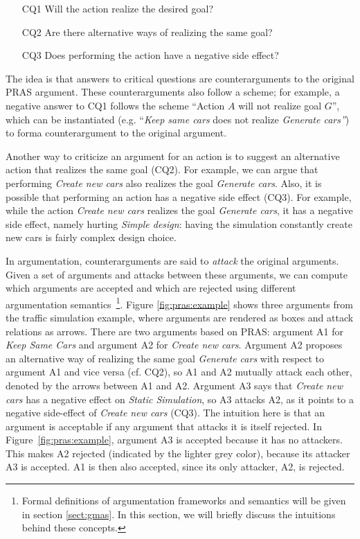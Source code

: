 \begin{enumerate}
\item[CQ1] Will the action realize the desired goal?
\item[CQ2] Are there alternative ways of realizing the same goal?
\item[CQ3] Does performing the action have a negative side effect?
\end{enumerate}

The idea is that answers to critical questions are counterarguments to the original PRAS argument. These counterarguments also follow a scheme; for example, a negative answer to CQ1 follows the scheme ``Action $A$ will not realize goal $G$'', which can be instantiated (e.g. ``\emph{Keep same cars} does not realize \emph{Generate cars''}) to forma counterargument to the original argument. 

Another way to criticize an argument for an action is to suggest an alternative action that realizes the same goal (CQ2). For example, we can argue that performing \emph{Create new cars} also realizes the goal \emph{Generate cars}. Also, it is possible that performing an action has a negative side effect (CQ3). For example, while the action \emph{Create new cars} realizes the goal \emph{Generate cars}, it has a negative side effect, namely hurting \emph{Simple design}: having the simulation constantly create new cars is fairly complex design choice. 

In argumentation, counterarguments are said to \emph{attack} the original arguments. Given a set of arguments and attacks between these arguments, we can compute which arguments are accepted and which are rejected using different argumentation semantics~\cite{Dung1995}\footnote{Formal definitions of argumentation frameworks and semantics will be given in section \ref{sect:gmas}. In this section, we will briefly discuss the intuitions behind these concepts.}. Figure \ref{fig:pras:example} shows three arguments from the traffic simulation example, where arguments are rendered as boxes and attack relations as arrows. There are two arguments based on PRAS: argument A1 for \emph{Keep Same Cars} and argument A2 for \emph{Create new cars}. Argument A2 proposes an alternative way of realizing the same goal \emph{Generate cars} with respect to argument A1 and vice versa (cf. CQ2), so A1 and A2 mutually attack each other, denoted by the arrows between A1 and A2. Argument A3 says that \emph{Create new cars} has a negative effect on \emph{Static Simulation}, so A3 attacks A2, as it points to a negative side-effect of \emph{Create new cars} (CQ3). The intuition here is that an argument is acceptable if any argument that attacks it is itself rejected. In Figure~\ref{fig:pras:example}, argument A3 is accepted because it has no attackers. This makes A2 rejected (indicated by the lighter grey color), because its attacker A3 is accepted. A1 is then also accepted, since its only attacker, A2, is rejected. 

